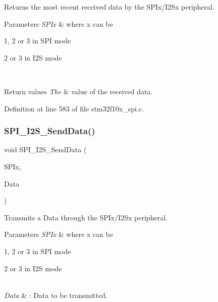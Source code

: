 Returns the most recent received data by the S\+P\+Ix/\+I2\+Sx peripheral. 


\begin{DoxyParams}{Parameters}
{\em S\+P\+Ix} & where x can be
\begin{DoxyItemize}
\item 1, 2 or 3 in S\+PI mode
\item 2 or 3 in I2S mode 
\end{DoxyItemize}\\
\hline
\end{DoxyParams}

\begin{DoxyRetVals}{Return values}
{\em The} & value of the received data. \\
\hline
\end{DoxyRetVals}


Definition at line 583 of file stm32f10x\+\_\+spi.\+c.

\mbox{\label{group___s_p_i___private___functions_gad5af40bebe8dbe3fa8bd476489d7e3da}} 
\subsubsection{\texorpdfstring{S\+P\+I\+\_\+\+I2\+S\+\_\+\+Send\+Data()}{SPI\_I2S\_SendData()}}
{\footnotesize\ttfamily void S\+P\+I\+\_\+\+I2\+S\+\_\+\+Send\+Data (\begin{DoxyParamCaption}\item[{\hyperlink{struct_s_p_i___type_def}{S\+P\+I\+\_\+\+Type\+Def} $\ast$}]{S\+P\+Ix,  }\item[{uint16\+\_\+t}]{Data }\end{DoxyParamCaption})}



Transmits a Data through the S\+P\+Ix/\+I2\+Sx peripheral. 


\begin{DoxyParams}{Parameters}
{\em S\+P\+Ix} & where x can be
\begin{DoxyItemize}
\item 1, 2 or 3 in S\+PI mode
\item 2 or 3 in I2S mode 
\end{DoxyItemize}\\
\hline
{\em Data} & \+: Data to be transmitted. \\
\hline
\end{DoxyParams}

